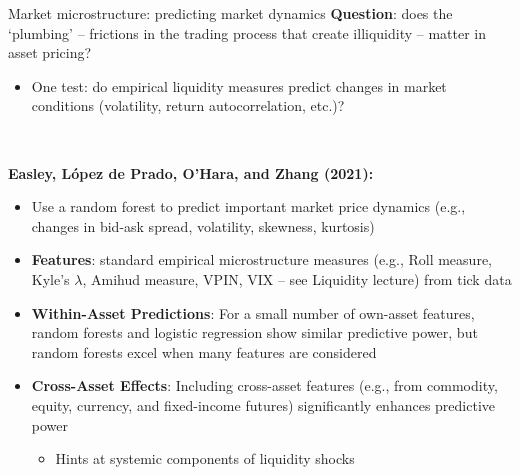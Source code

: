 \documentclass[xcolor=table, aspectratio=169]{beamer}
\newcommand{\alertbf}[1]{\alert{\textbf{#1}}}
\begin{document}
\begin{frame}{Market microstructure: predicting market dynamics}
\alertbf{Question}: does the `plumbing' -- frictions in the trading process that create illiquidity -- matter in asset pricing?
\begin{itemize}
    \item One test: do empirical liquidity measures predict changes in market conditions (volatility, return autocorrelation, etc.)?
\end{itemize}

~

\alertbf{Easley, López de Prado, O’Hara, and Zhang (2021):}    
    \begin{itemize}
        \item Use a random forest to predict important market price dynamics (e.g., changes in bid-ask spread, volatility, skewness, kurtosis)
        \item \alertbf{Features}: standard empirical microstructure measures (e.g., Roll measure, Kyle's $\lambda$, Amihud measure, VPIN, VIX -- see Liquidity lecture) from tick data 
        \item \alertbf{Within-Asset Predictions}: For a small number of own-asset features, random forests and logistic regression show similar predictive power, but random forests excel when many features are considered
        \item \alertbf{Cross-Asset Effects}: Including cross-asset features (e.g., from commodity, equity, currency, and fixed-income futures) significantly enhances predictive power
            \begin{itemize}
                \item Hints at systemic components of liquidity shocks
            \end{itemize}
    \end{itemize}
\end{frame}
\end{document}
